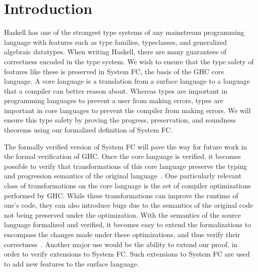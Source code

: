 \documentclass{sig-alternate}
\begin{document}
\section{Introduction}
\label{sec:intro}
Haskell has one of the strongest type systems of any mainstream programming language with features such as type families, typeclasses, and generalized algebraic datatypes. When writing Haskell, there are many guarantees of correctness encoded in the type system. We wish to ensure that the type safety of features like these is preserved in System FC, the basis of the GHC core language. A core language is a translation from a surface language to a language that a compiler can better reason about. Whereas types are important in programming languages to prevent a user from making errors, types are important in core languages to prevent the compiler from making errors. We will ensure this type safety by proving the progress, preservation, and soundness theorems using our formalized definition of System FC.



The formally verified version of System FC will pave the way for future work in the formal verification of GHC. Once the core language is verified, it becomes possible to verify that transformations of this core language preserve the typing and progression semantics of the original language~\cite{zhao2013formalizing}. One particularly relevant class of transformations on the core language is the set of compiler optimizations performed by GHC. While these transformations can improve the runtime of one's code, they can also introduce bugs due to the semantics of the original code not being preserved under the optimization. With the semantics of the source language formalized and verified, it becomes easy to extend the formalizations to encompass the changes made under these optimizations, and thus verify their correctness~\cite{Zhao:2012:FLI:2103656.2103709}. Another major use would be the ability to extend our proof, in order to verify extensions to System FC. Such extensions to System FC are used to add new features to the surface language.
\end{document}
